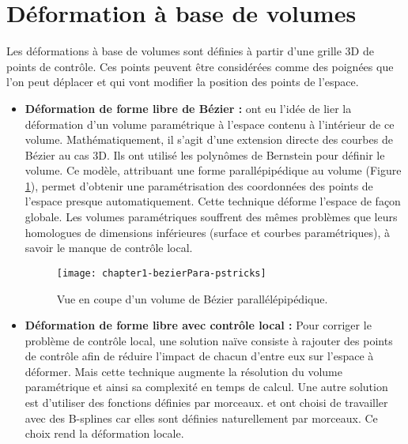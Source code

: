 \section{Déformation à base de volumes}

Les déformations à base de volumes sont définies à partir d'une grille 3D de
points de contrôle. Ces points peuvent être considérées comme des poignées que
l'on peut déplacer et qui vont modifier la position des points de l'espace.

\begin{itemize}

\item{\textbf{Déformation de forme libre de Bézier :}} \cite{SP86} ont eu
l'idée de lier la déformation d'un volume paramétrique à l'espace contenu à
l'intérieur de ce volume. Mathématiquement, il s'agit d'une extension directe
des courbes de Bézier au cas 3D. Ils ont utilisé les polynômes de Bernstein
pour définir le volume. Ce modèle, attribuant une forme parallépipédique au
volume (Figure \ref{SURPar}), permet d'obtenir une paramétrisation des
coordonnées des points de l'espace presque automatiquement. Cette technique
déforme l'espace de façon globale. Les volumes paramétriques souffrent des
mêmes problèmes que leurs homologues de dimensions inférieures (surface et
courbes paramétriques), à savoir le manque de contrôle local.

\begin{figure}[!ht]
  \texttt{[image: chapter1-bezierPara-pstricks]}
  \caption[Volume de Bézier parallélépipédique] {Vue en coupe d'un volume de
  Bézier parallélépipédique.}
  \label{SURPar}
\end{figure}

\item{\textbf{Déformation de forme libre avec contrôle local :}} Pour corriger
le problème de contrôle local, une solution naïve consiste à rajouter des
points de contrôle afin de réduire l'impact de chacun d'entre eux sur l'espace
à déformer. Mais cette technique augmente la résolution du volume paramétrique
et ainsi sa complexité en temps de calcul. Une autre solution est d'utiliser
des fonctions définies par morceaux. \cite{GP89} et \cite{Com89} ont choisi de
travailler avec des B-splines car elles sont définies naturellement par
morceaux. Ce choix rend la déformation locale.


\end{itemize}
